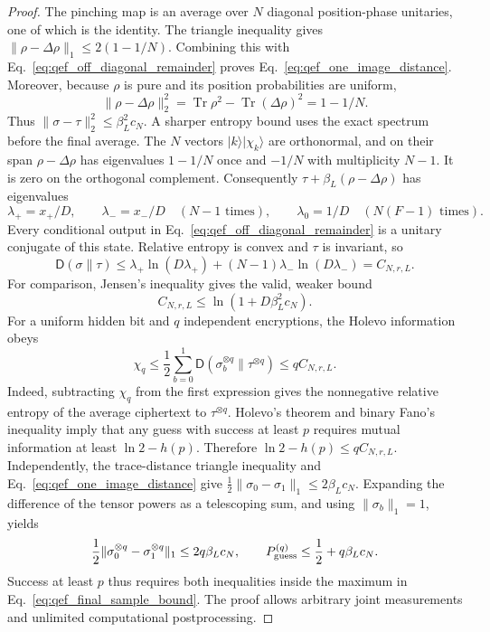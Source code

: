 \documentclass[11pt,a4paper]{article}
\begin{document}
{\begin{proof}
The pinching map is an average over $N$ diagonal position-phase
unitaries, one of which is the identity. The triangle inequality gives
$\|\rho-\Delta\rho\|_1\leq2(1-1/N)$. Combining this with
Eq.~\eqref{eq:qef_off_diagonal_remainder} proves
Eq.~\eqref{eq:qef_one_image_distance}.
Moreover, because $\rho$ is pure and its position probabilities are
uniform,
\begin{equation}
 \|\rho-\Delta\rho\|_2^2
 =\operatorname{Tr}\rho^2-\operatorname{Tr}(\Delta\rho)^2
 =1-1/N.
\end{equation}
Thus $\|\sigma-\tau\|_2^2\leq\beta_L^2c_N$. A sharper entropy bound
uses the exact spectrum before the final average. The $N$ vectors
$|k\rangle|\chi_k\rangle$ are orthonormal, and on their span
$\rho-\Delta\rho$ has eigenvalues $1-1/N$ once and $-1/N$ with
multiplicity $N-1$. It is zero on the orthogonal complement.
Consequently $\tau+\beta_L(\rho-\Delta\rho)$ has eigenvalues
\begin{equation}
 \lambda_+=x_+/D,\qquad
 \lambda_-=x_-/D\quad(N-1\text{ times}),\qquad
 \lambda_0=1/D\quad(N(F-1)\text{ times}).
\end{equation}
Every conditional output in
Eq.~\eqref{eq:qef_off_diagonal_remainder} is a unitary conjugate of
this state. Relative entropy is convex and $\tau$ is invariant, so
\begin{equation}
 \mathsf D(\sigma\|\tau)
 \leq\lambda_+\ln(D\lambda_+)
       +(N-1)\lambda_-\ln(D\lambda_-)
 =C_{N,r,L}.
\end{equation}
For comparison, Jensen's inequality gives the valid, weaker bound
\begin{equation}
 C_{N,r,L}\leq\ln(1+D\beta_L^2c_N).
\end{equation}
For a uniform hidden bit and $q$ independent encryptions, the Holevo
information obeys
\begin{equation}
 \chi_q\leq\frac12\sum_{b=0}^1
 \mathsf D(\sigma_b^{\otimes q}\|\tau^{\otimes q})
 \leq qC_{N,r,L}.
\end{equation}
Indeed, subtracting $\chi_q$ from the first expression gives the
nonnegative relative entropy of the average ciphertext to
$\tau^{\otimes q}$. Holevo's theorem and binary Fano's inequality
\cite{Watrous2018QEF} imply that any guess with success at least $p$
requires mutual information at least $\ln2-h(p)$. Therefore
$\ln2-h(p)\leq qC_{N,r,L}$. Independently, the trace-distance triangle
inequality and Eq.~\eqref{eq:qef_one_image_distance} give
$\frac12\|\sigma_0-\sigma_1\|_1\leq2\beta_Lc_N$.
Expanding the difference of the tensor powers as a telescoping sum,
and using $\|\sigma_b\|_1=1$, yields
\begin{equation}
 \frac12\|\sigma_0^{\otimes q}-\sigma_1^{\otimes q}\|_1
 \leq 2q\beta_Lc_N,\qquad
 P_{\rm guess}^{(q)}\leq\frac12+q\beta_Lc_N.
\end{equation}
Success at least $p$ thus requires both inequalities inside the maximum
in Eq.~\eqref{eq:qef_final_sample_bound}. The proof allows arbitrary
joint measurements and unlimited computational postprocessing.
\end{proof}

}
\end{document}
